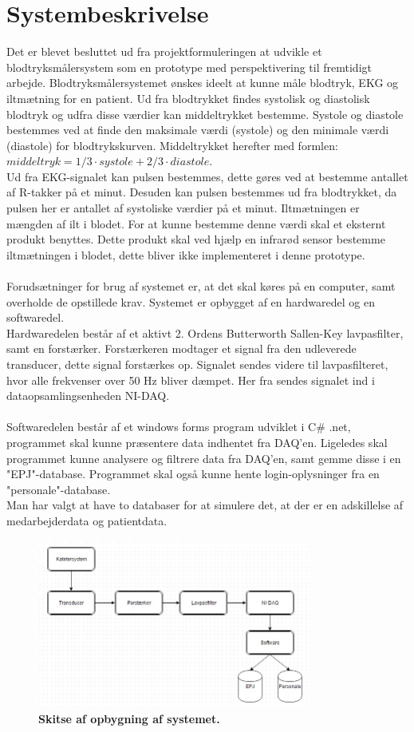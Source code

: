 \chapter{Systembeskrivelse}
Det er blevet besluttet ud fra projektformuleringen at udvikle et blodtryksmålersystem som en prototype med perspektivering til fremtidigt arbejde. Blodtryksmålersystemet ønskes ideelt at kunne måle blodtryk, EKG og iltmætning for en patient. Ud fra blodtrykket findes systolisk og diastolisk blodtryk og udfra disse værdier kan middeltrykket bestemme. Systole og diastole bestemmes ved at finde den maksimale værdi (systole) og den minimale værdi (diastole) for blodtrykskurven. Middeltrykket herefter med formlen: $middeltryk = 1/3 \cdot systole + 2/3 \cdot diastole$. \cite{blodtrykwiki}
\\ Ud fra EKG-signalet kan pulsen bestemmes, dette gøres ved at bestemme antallet af R-takker på et minut. Desuden kan pulsen bestemmes ud fra blodtrykket, da pulsen her er antallet af systoliske værdier på et minut. Iltmætningen er mængden af ilt i blodet. For at kunne bestemme denne værdi skal et eksternt produkt benyttes. Dette produkt skal ved hjælp en infrarød sensor bestemme iltmætningen i blodet, dette bliver ikke implementeret i denne prototype.\\\\
Forudsætninger for brug af systemet er, at det skal køres på en computer, samt overholde de opstillede krav. Systemet er opbygget af en hardwaredel og en softwaredel. \\
Hardwaredelen består af et aktivt 2. Ordens Butterworth Sallen-Key lavpasfilter, samt en forstærker. Forstærkeren modtager et signal fra den udleverede transducer, dette signal forstærkes op. Signalet sendes videre til lavpasfilteret, hvor alle frekvenser over 50 Hz bliver dæmpet. Her fra sendes signalet ind i dataopsamlingsenheden NI-DAQ.\\\\
Softwaredelen består af et windows forms program udviklet i C\# .net, programmet skal kunne præsentere data indhentet fra DAQ’en. Ligeledes skal programmet kunne analysere og filtrere data fra DAQ’en, samt gemme disse i en "EPJ"-database. Programmet skal også kunne hente login-oplysninger fra en "personale"-database. \\
Man har valgt at have to databaser for at simulere det, at der er en adskillelse af medarbejderdata og patientdata.
\begin{figure}[H]
\includegraphics[width =0.8\textwidth , center]{billeder/system}
\caption{\textbf{Skitse af opbygning af systemet.}}
\end{figure}

